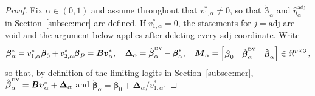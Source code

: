 \documentclass{article}
\theoremstyle{definition}
\newcommand*{\bb}{\boldsymbol}
\newcommand{\betady}{\ensuremath{\hat{\bbeta}^{\textrm{\tiny DY}}}}
\def\bv{\bb{v}}
\def\bbeta{\bb{\beta}}
\begin{document}
\begin{bibunit}
\begin{proof}
Fix $\alpha\in(0,1)$ and assume throughout that $v_{1,\alpha}^*\neq0$, so
that $\check{\bbeta}_\alpha$ and $\hat\eta_\alpha^{\mathrm{adj}}$ in
Section~\ref{subsec:mer} are defined. If $v_{1,\alpha}^*=0$, the statements for
$j=\mathrm{adj}$ are void and the argument below applies after
deleting every $\mathrm{adj}$ coordinate. Write
\begin{equation}
\label{eq:prediction-proof-notation}
    \bbeta_\alpha^*
    =
    v_{1,\alpha}^*\bbeta_0+v_{2,\alpha}^*\bbeta_P
    =
    \bb B\bv_\alpha^*,
    \quad
    \bb\Delta_\alpha
    =
    \betady_\alpha-\bbeta_\alpha^*,
    \quad
    \bb M_\alpha
    =
    \begin{bmatrix}
        \bbeta_0 & \betady_\alpha & \check{\bbeta}_\alpha
    \end{bmatrix}
    \in\Re^{p\times3}\,,
\end{equation}
so that, by definition of the limiting logits in Section~\ref{subsec:mer},
$
    \betady_\alpha
    =
    \bb B\bv_\alpha^*+\bb\Delta_\alpha
$
and
$
    \check{\bbeta}_\alpha
    =
    \bbeta_0+\bb\Delta_\alpha/v_{1,\alpha}^*
$.


\end{proof}
\end{bibunit}
\end{document}
